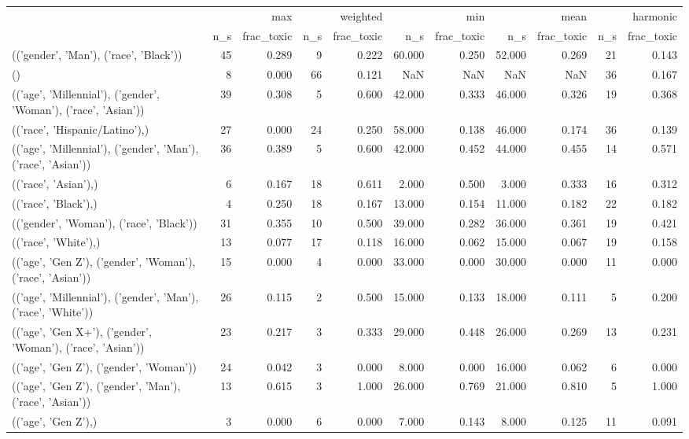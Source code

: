 \begin{tabular}{lrrrrrrrrrr}
\toprule
 & \multicolumn{2}{r}{max} & \multicolumn{2}{r}{weighted} & \multicolumn{2}{r}{min} & \multicolumn{2}{r}{mean} & \multicolumn{2}{r}{harmonic} \\
 & n_s & frac_toxic & n_s & frac_toxic & n_s & frac_toxic & n_s & frac_toxic & n_s & frac_toxic \\
\midrule
(('gender', 'Man'), ('race', 'Black')) & 45 & 0.289 & 9 & 0.222 & 60.000 & 0.250 & 52.000 & 0.269 & 21 & 0.143 \\
() & 8 & 0.000 & 66 & 0.121 & NaN & NaN & NaN & NaN & 36 & 0.167 \\
(('age', 'Millennial'), ('gender', 'Woman'), ('race', 'Asian')) & 39 & 0.308 & 5 & 0.600 & 42.000 & 0.333 & 46.000 & 0.326 & 19 & 0.368 \\
(('race', 'Hispanic/Latino'),) & 27 & 0.000 & 24 & 0.250 & 58.000 & 0.138 & 46.000 & 0.174 & 36 & 0.139 \\
(('age', 'Millennial'), ('gender', 'Man'), ('race', 'Asian')) & 36 & 0.389 & 5 & 0.600 & 42.000 & 0.452 & 44.000 & 0.455 & 14 & 0.571 \\
(('race', 'Asian'),) & 6 & 0.167 & 18 & 0.611 & 2.000 & 0.500 & 3.000 & 0.333 & 16 & 0.312 \\
(('race', 'Black'),) & 4 & 0.250 & 18 & 0.167 & 13.000 & 0.154 & 11.000 & 0.182 & 22 & 0.182 \\
(('gender', 'Woman'), ('race', 'Black')) & 31 & 0.355 & 10 & 0.500 & 39.000 & 0.282 & 36.000 & 0.361 & 19 & 0.421 \\
(('race', 'White'),) & 13 & 0.077 & 17 & 0.118 & 16.000 & 0.062 & 15.000 & 0.067 & 19 & 0.158 \\
(('age', 'Gen Z'), ('gender', 'Woman'), ('race', 'Asian')) & 15 & 0.000 & 4 & 0.000 & 33.000 & 0.000 & 30.000 & 0.000 & 11 & 0.000 \\
(('age', 'Millennial'), ('gender', 'Man'), ('race', 'White')) & 26 & 0.115 & 2 & 0.500 & 15.000 & 0.133 & 18.000 & 0.111 & 5 & 0.200 \\
(('age', 'Gen X+'), ('gender', 'Woman'), ('race', 'Asian')) & 23 & 0.217 & 3 & 0.333 & 29.000 & 0.448 & 26.000 & 0.269 & 13 & 0.231 \\
(('age', 'Gen Z'), ('gender', 'Woman')) & 24 & 0.042 & 3 & 0.000 & 8.000 & 0.000 & 16.000 & 0.062 & 6 & 0.000 \\
(('age', 'Gen Z'), ('gender', 'Man'), ('race', 'Asian')) & 13 & 0.615 & 3 & 1.000 & 26.000 & 0.769 & 21.000 & 0.810 & 5 & 1.000 \\
(('age', 'Gen Z'),) & 3 & 0.000 & 6 & 0.000 & 7.000 & 0.143 & 8.000 & 0.125 & 11 & 0.091 \\

\end{tabular}
